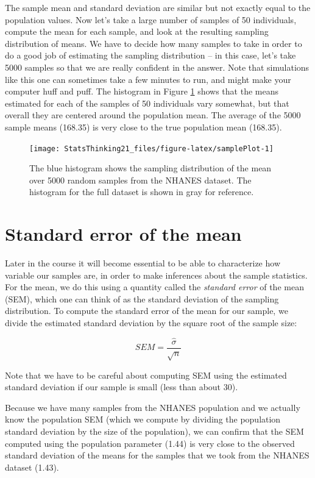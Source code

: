 \documentclass[12pt,]{book}
\theoremstyle{definition}
\theoremstyle{definition}
\theoremstyle{definition}
\theoremstyle{remark}
\begin{document}
The sample mean and standard deviation are similar but not exactly equal to the population values. Now let's take a large number of samples of 50 individuals, compute the mean for each sample, and look at the resulting sampling distribution of means. We have to decide how many samples to take in order to do a good job of estimating the sampling distribution -- in this case, let's take 5000 samples so that we are really confident in the answer. Note that simulations like this one can sometimes take a few minutes to run, and might make your computer huff and puff. The histogram in Figure \ref{fig:samplePlot} shows that the means estimated for each of the samples of 50 individuals vary somewhat, but that overall they are centered around the population mean. The average of the 5000 sample means (168.35) is very close to the true population mean (168.35).

\begin{figure}
\texttt{[image: StatsThinking21\_files/figure-latex/samplePlot-1]} \caption{The blue histogram shows the sampling distribution of the mean over 5000 random samples from the NHANES dataset.  The histogram for the full dataset is shown in gray for reference.}\label{fig:samplePlot}
\end{figure}

\hypertarget{standard-error-of-the-mean}{%
\section{Standard error of the mean}\label{standard-error-of-the-mean}}

Later in the course it will become essential to be able to characterize how variable our samples are, in order to make inferences about the sample statistics. For the mean, we do this using a quantity called the \emph{standard error} of the mean (SEM), which one can think of as the standard deviation of the sampling distribution. To compute the standard error of the mean for our sample, we divide the estimated standard deviation by the square root of the sample size:

\[
SEM = \frac{\hat{\sigma}}{\sqrt{n}}
\]

Note that we have to be careful about computing SEM using the estimated standard deviation if our sample is small (less than about 30).

Because we have many samples from the NHANES population and we actually know the population SEM (which we compute by dividing the population standard deviation by the size of the population), we can confirm that the SEM computed using the population parameter (1.44) is very close to the observed standard deviation of the means for the samples that we took from the NHANES dataset (1.43).
\end{document}
